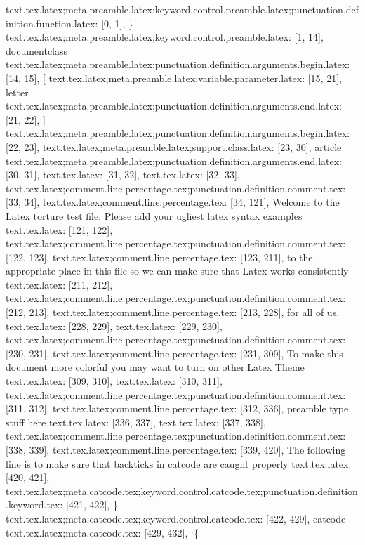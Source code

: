 text.tex.latex;meta.preamble.latex;keyword.control.preamble.latex;punctuation.definition.function.latex: [0, 1], {\}
text.tex.latex;meta.preamble.latex;keyword.control.preamble.latex: [1, 14], {documentclass}
text.tex.latex;meta.preamble.latex;punctuation.definition.arguments.begin.latex: [14, 15], {[}
text.tex.latex;meta.preamble.latex;variable.parameter.latex: [15, 21], {letter}
text.tex.latex;meta.preamble.latex;punctuation.definition.arguments.end.latex: [21, 22], {]}
text.tex.latex;meta.preamble.latex;punctuation.definition.arguments.begin.latex: [22, 23], {{}
text.tex.latex;meta.preamble.latex;support.class.latex: [23, 30], {article}
text.tex.latex;meta.preamble.latex;punctuation.definition.arguments.end.latex: [30, 31], {}}
text.tex.latex: [31, 32], {
}
text.tex.latex: [32, 33], {
}
text.tex.latex;comment.line.percentage.tex;punctuation.definition.comment.tex: [33, 34], {%
text.tex.latex;comment.line.percentage.tex: [34, 121], { Welcome to the Latex torture test file.  Please add your ugliest latex syntax examples}
text.tex.latex: [121, 122], {
}
text.tex.latex;comment.line.percentage.tex;punctuation.definition.comment.tex: [122, 123], {%
text.tex.latex;comment.line.percentage.tex: [123, 211], { to the appropriate place in this file so we can make sure that Latex works consistently}
text.tex.latex: [211, 212], {
}
text.tex.latex;comment.line.percentage.tex;punctuation.definition.comment.tex: [212, 213], {%
text.tex.latex;comment.line.percentage.tex: [213, 228], { for all of us.}
text.tex.latex: [228, 229], {
}
text.tex.latex: [229, 230], {
}
text.tex.latex;comment.line.percentage.tex;punctuation.definition.comment.tex: [230, 231], {%
text.tex.latex;comment.line.percentage.tex: [231, 309], { To make this document more colorful you may want to turn on other:Latex Theme}
text.tex.latex: [309, 310], {
}
text.tex.latex: [310, 311], {
}
text.tex.latex;comment.line.percentage.tex;punctuation.definition.comment.tex: [311, 312], {%
text.tex.latex;comment.line.percentage.tex: [312, 336], {preamble type stuff here}
text.tex.latex: [336, 337], {
}
text.tex.latex: [337, 338], {
}
text.tex.latex;comment.line.percentage.tex;punctuation.definition.comment.tex: [338, 339], {%
text.tex.latex;comment.line.percentage.tex: [339, 420], { The following line is to make sure that backticks in catcode are caught properly}
text.tex.latex: [420, 421], {
}
text.tex.latex;meta.catcode.tex;keyword.control.catcode.tex;punctuation.definition.keyword.tex: [421, 422], {\}
text.tex.latex;meta.catcode.tex;keyword.control.catcode.tex: [422, 429], {catcode}
text.tex.latex;meta.catcode.tex: [429, 432], {`\{}
}}}}}}}}
